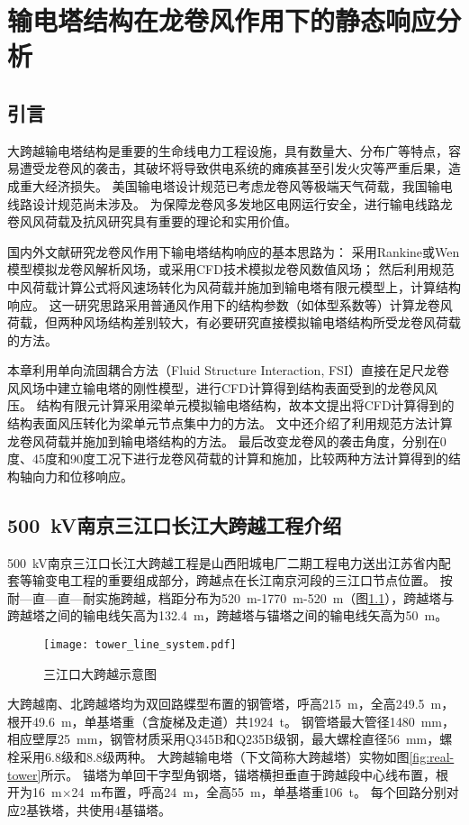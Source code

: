 \graphicspath{{figures/static/}}
\chapter{输电塔结构在龙卷风作用下的静态响应分析}\label{chapter:static}

\section{引言}
大跨越输电塔结构是重要的生命线电力工程设施，具有数量大、分布广等特点，容易遭受龙卷风的袭击，其破坏将导致供电系统的瘫痪甚至引发火灾等严重后果，造成重大经济损失。
美国输电塔设计规范已考虑龙卷风等极端天气荷载，我国输电线路设计规范尚未涉及。
为保障龙卷风多发地区电网运行安全，进行输电线路龙卷风风荷载及抗风研究具有重要的理论和实用价值。

国内外文献研究龙卷风作用下输电塔结构响应的基本思路为：
采用Rankine或Wen模型模拟龙卷风解析风场，或采用CFD技术模拟龙卷风数值风场；
然后利用规范中风荷载计算公式将风速场转化为风荷载并施加到输电塔有限元模型上，计算结构响应。
这一研究思路采用普通风作用下的结构参数（如体型系数等）计算龙卷风荷载，但两种风场结构差别较大，有必要研究直接模拟输电塔结构所受龙卷风荷载的方法。

本章利用单向流固耦合方法（Fluid Structure Interaction, FSI）直接在足尺龙卷风风场中建立输电塔的刚性模型，进行CFD计算得到结构表面受到的龙卷风风压。
结构有限元计算采用梁单元模拟输电塔结构，故本文提出将CFD计算得到的结构表面风压转化为梁单元节点集中力的方法。
文中还介绍了利用规范方法计算龙卷风荷载并施加到输电塔结构的方法。
最后改变龙卷风的袭击角度，分别在0度、45度和90度工况下进行龙卷风荷载的计算和施加，比较两种方法计算得到的结构轴向力和位移响应。

\section{\SI{500}{kV}南京三江口长江大跨越工程介绍}
\SI{500}{kV}南京三江口长江大跨越工程是山西阳城电厂二期工程电力送出江苏省内配套等输变电工程的重要组成部分，跨越点在长江南京河段的三江口节点位置。
按耐—直—直—耐实施跨越，档距分布为\SI{520}{m}-\SI{1770}{m}-\SI{520}{m}（图\ref{fig:tower-line}），跨越塔与跨越塔之间的输电线矢高为\SI{132.4}{m}，跨越塔与锚塔之间的输电线矢高为\SI{50}{m}。
\begin{figure}[!htbp]
	\centering
	\texttt{[image: tower\_line\_system.pdf]}
	\caption{三江口大跨越示意图}
	\label{fig:tower-line}
\end{figure}

大跨越南、北跨越塔均为双回路蝶型布置的钢管塔，呼高\SI{215}{m}，全高\SI{249.5}{m}，根开\SI{49.6}{m}，单基塔重（含旋梯及走道）共\SI{1924}{t}。
钢管塔最大管径\SI{1480}{mm}，相应壁厚\SI{25}{mm}，钢管材质采用Q345B和Q235B级钢，最大螺栓直径\SI{56}{mm}，螺栓采用6.8级和8.8级两种。
大跨越输电塔（下文简称大跨越塔）实物如图\ref{fig:real-tower}所示。
锚塔为单回干字型角钢塔，锚塔横担垂直于跨越段中心线布置，根开为\SI{16}{m}$\times$\SI{24}{m}布置，呼高\SI{24}{m}，全高\SI{55}{m}，单基塔重\SI{106}{t}。
每个回路分别对应2基铁塔，共使用4基锚塔。

